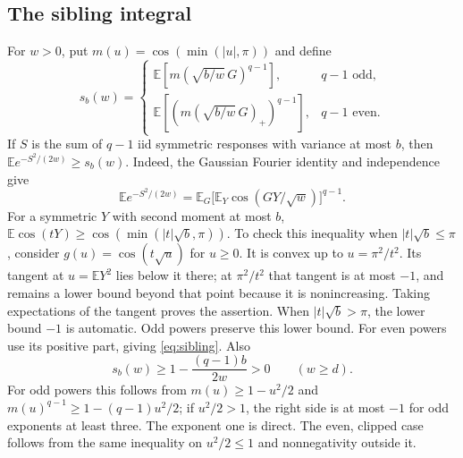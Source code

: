 \documentclass[11pt]{article}
\theoremstyle{definition}
\theoremstyle{remark}
\newcommand{\E}{\mathbb E}
\begin{document}
\subsection{The sibling integral}
For $w>0$, put $m(u)=\cos(\min(|u|,\pi))$ and define
\begin{equation}
 s_b(w)=\begin{cases}
 \E[m(\sqrt{b/w}\,G)^{q-1}],&q-1\text{ odd},\\
 \E[(m(\sqrt{b/w}\,G)_+)^{q-1}],&q-1\text{ even}.
 \end{cases}
 \label{eq:sibling}
\end{equation}
If $S$ is the sum of $q-1$ iid symmetric responses with variance at most
$b$, then $\E e^{-S^2/(2w)}\ge s_b(w)$.
Indeed, the Gaussian Fourier identity and independence give
\[
 \E e^{-S^2/(2w)}=\E_G\bigl[\E_Y\cos(GY/\sqrt w)\bigr]^{q-1}.
\]
For a symmetric $Y$ with second moment at most $b$,
$\E\cos(tY)\ge\cos(\min(|t|\sqrt b,\pi))$.
To check this inequality when $|t|\sqrt b\le\pi$, consider
$g(u)=\cos(t\sqrt u)$ for $u\ge0$. It is convex up to
$u=\pi^2/t^2$. Its tangent at $u=\E Y^2$ lies below it there; at
$\pi^2/t^2$ that tangent is at most $-1$, and remains a lower bound
beyond that point because it is nonincreasing.
Taking expectations of the tangent proves the assertion. When
$|t|\sqrt b>\pi$, the lower bound $-1$ is automatic.
Odd powers preserve this lower bound. For even powers use its positive
part, giving \eqref{eq:sibling}. Also
\[
 s_b(w)\ge1-\frac{(q-1)b}{2w}>0\qquad(w\ge d).
\]
For odd powers this follows from $m(u)\ge1-u^2/2$ and
$m(u)^{q-1}\ge1-(q-1)u^2/2$; if $u^2/2>1$, the right side is at most
$-1$ for odd exponents at least three. The exponent one is direct.
The even, clipped case follows from the same inequality on $u^2/2\le1$
and nonnegativity outside it.
\end{document}
